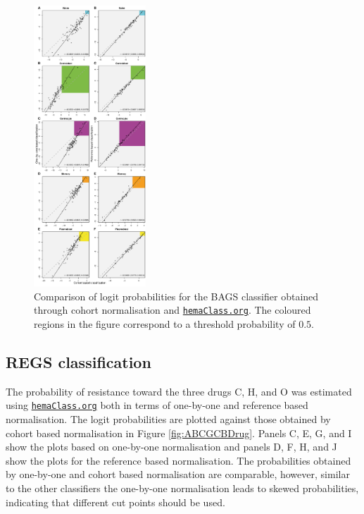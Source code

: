 \documentclass{article}
\newcommand{\hemaClass}{\href{http://hemaClass.org}{\texttt{hemaClass.org}}}
\begin{document}
\begin{figure}
\begin{center}
\includegraphics[width=0.375\textwidth]{figures/figure3.pdf}
\end{center}
\caption{Comparison of logit probabilities for the BAGS classifier obtained through cohort normalisation and \hemaClass{}.
The coloured regions in the figure correspond to a threshold probability of $0.5$.}
\label{fig:Bagscorr}
\end{figure}
\newpage


\subsection{REGS classification}

The probability of resistance toward the three drugs C, H, and O was estimated using \hemaClass{} both in terms of one-by-one and reference based normalisation.
The logit probabilities are plotted against those obtained by cohort based normalisation in Figure \ref{fig:ABCGCBDrug}.
Panels C, E, G, and I show the plots based on one-by-one normalisation and panels D, F, H, and J show the plots for the reference based normalisation.
The probabilities obtained by one-by-one and cohort based normalisation are comparable, however, similar to the other classifiers the one-by-one normalisation leads to skewed probabilities, indicating that different cut points should be used.
\end{document}

